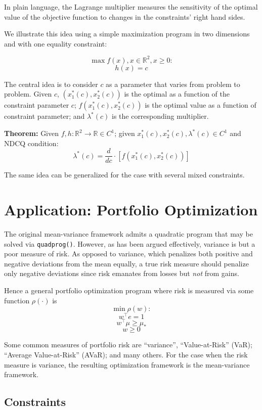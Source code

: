 \documentclass[11pt,]{article}
\begin{document}
In plain language, the Lagrange multiplier measures the sensitivity of
the optimal value of the objective function to changes in the
constraints' right hand sides.

We illustrate this idea using a simple maximization program in two
dimensions and with one equality constraint:

\[\max f(x),x\in \mathbb{R}^2,x\geq 0:\] \[h(x)=c\]

The central idea is to consider \(c\) as a parameter that varies from
problem to problem. Given \(c\), \((x_1^*(c),x_2^*(c))\) is the optimal
as a function of the constraint parameter \(c\);
\(f(x_1^*(c),x_2^*(c))\) is the optimal value as a function of
constraint parameter; and \(\lambda^*(c)\) is the corresponding
multiplier.

\textbf{Theorem:} Given \(f,h:\mathbb{R}^2\to \mathbb{R}\in C^1\); given
\(x_1^*(c),x_2^*(c),\lambda^*(c)\in C^1\) and NDCQ condition:
\[\lambda^*(c)=\frac{d}{dc}\cdot [f(x_1^*(c),x_2^*(c))]\]

The same idea can be generalized for the case with several mixed
constraints.

\section{Application: Portfolio
Optimization}\label{application-portfolio-optimization}

The original mean-variance framework admits a quadratic program that may
be solved via \texttt{quadprog()}. However, as has been argued
effectively, variance is but a poor measure of risk. As opposed to
variance, which penalizes both positive and negative deviations from the
mean equally, a true risk measure should penalize only negative
deviations since risk emanates from losses but \emph{not} from gains.

Hence a general portfolio optimization program where risk is measured
via some function \(\rho(\cdot)\) is \[\min{} \rho(w):\] \[w^{\top}e=1\]
\[w^{\top}\mu \geq \mu_*\] \[w\geq 0\]

Some common measures of portfolio risk are ``variance'',
``Value-at-Risk'' (VaR); ``Average Value-at-Risk'' (AVaR); and many
others. For the case when the risk measure is variance, the resulting
optimization framework is the mean-variance framework.

\subsection{Constraints}\label{constraints}
\end{document}
